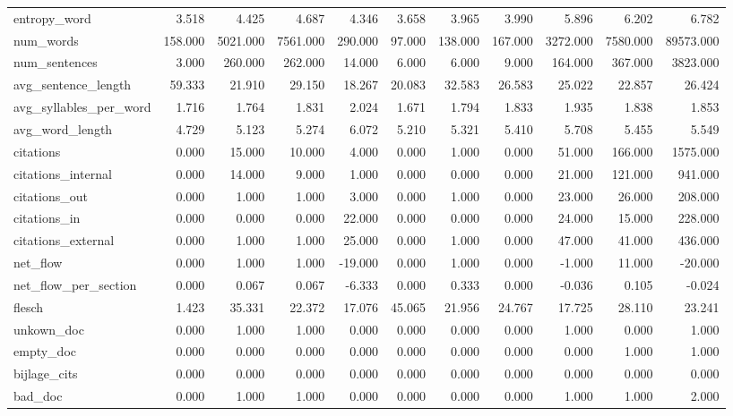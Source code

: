 \begin{tabular}{lrrrrrrrrrr}
\cline{1-11}
entropy\_word & 3.518 & 4.425 & 4.687 & 4.346 & 3.658 & 3.965 & 3.990 & 5.896 & 6.202 & 6.782 \\
\cline{1-11}
num\_words & 158.000 & 5021.000 & 7561.000 & 290.000 & 97.000 & 138.000 & 167.000 & 3272.000 & 7580.000 & 89573.000 \\
\cline{1-11}
num\_sentences & 3.000 & 260.000 & 262.000 & 14.000 & 6.000 & 6.000 & 9.000 & 164.000 & 367.000 & 3823.000 \\
\cline{1-11}
avg\_sentence\_length & 59.333 & 21.910 & 29.150 & 18.267 & 20.083 & 32.583 & 26.583 & 25.022 & 22.857 & 26.424 \\
\cline{1-11}
avg\_syllables\_per\_word & 1.716 & 1.764 & 1.831 & 2.024 & 1.671 & 1.794 & 1.833 & 1.935 & 1.838 & 1.853 \\
\cline{1-11}
avg\_word\_length & 4.729 & 5.123 & 5.274 & 6.072 & 5.210 & 5.321 & 5.410 & 5.708 & 5.455 & 5.549 \\
\cline{1-11}
citations & 0.000 & 15.000 & 10.000 & 4.000 & 0.000 & 1.000 & 0.000 & 51.000 & 166.000 & 1575.000 \\
\cline{1-11}
citations\_internal & 0.000 & 14.000 & 9.000 & 1.000 & 0.000 & 0.000 & 0.000 & 21.000 & 121.000 & 941.000 \\
\cline{1-11}
citations\_out & 0.000 & 1.000 & 1.000 & 3.000 & 0.000 & 1.000 & 0.000 & 23.000 & 26.000 & 208.000 \\
\cline{1-11}
citations\_in & 0.000 & 0.000 & 0.000 & 22.000 & 0.000 & 0.000 & 0.000 & 24.000 & 15.000 & 228.000 \\
\cline{1-11}
citations\_external & 0.000 & 1.000 & 1.000 & 25.000 & 0.000 & 1.000 & 0.000 & 47.000 & 41.000 & 436.000 \\
\cline{1-11}
net\_flow & 0.000 & 1.000 & 1.000 & -19.000 & 0.000 & 1.000 & 0.000 & -1.000 & 11.000 & -20.000 \\
\cline{1-11}
net\_flow\_per\_section & 0.000 & 0.067 & 0.067 & -6.333 & 0.000 & 0.333 & 0.000 & -0.036 & 0.105 & -0.024 \\
\cline{1-11}
flesch & 1.423 & 35.331 & 22.372 & 17.076 & 45.065 & 21.956 & 24.767 & 17.725 & 28.110 & 23.241 \\
\cline{1-11}
unkown\_doc & 0.000 & 1.000 & 1.000 & 0.000 & 0.000 & 0.000 & 0.000 & 1.000 & 0.000 & 1.000 \\
\cline{1-11}
empty\_doc & 0.000 & 0.000 & 0.000 & 0.000 & 0.000 & 0.000 & 0.000 & 0.000 & 1.000 & 1.000 \\
\cline{1-11}
bijlage\_cits & 0.000 & 0.000 & 0.000 & 0.000 & 0.000 & 0.000 & 0.000 & 0.000 & 0.000 & 0.000 \\
\cline{1-11}
bad\_doc & 0.000 & 1.000 & 1.000 & 0.000 & 0.000 & 0.000 & 0.000 & 1.000 & 1.000 & 2.000 \\
\cline{1-11}
\bottomrule
\end{tabular}
